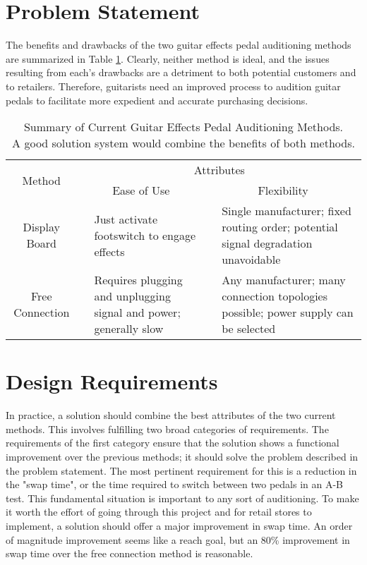 \section{Problem Statement}

The benefits and drawbacks of the two guitar effects pedal auditioning methods are summarized in Table \ref{tab:prev_method_pro_con}.  Clearly, neither method is ideal, and the issues resulting from each's drawbacks are a detriment to both potential customers and to retailers.  Therefore, guitarists need an improved process to audition guitar pedals to facilitate more expedient and accurate purchasing decisions.

	\begin{table}
	\begin{center}
	\renewcommand{\arraystretch}{2}
	\captionsetup{justification=centering}
	\caption{Summary of Current Guitar Effects Pedal Auditioning Methods.  \\A good solution system would combine the benefits of both methods.}
	\raggedbottom
	\begin{tabular}{|c|c p{2in}|c p{2in}|}
		\hline
		\multirow{2}{*}{Method} & \multicolumn{4}{c|}{Attributes} \\
		 & \multicolumn{2}{c}{Ease of Use} & \multicolumn{2}{c|}{Flexibility} \\
		\hline
		Display Board & 
		\cmark & 
		Just activate footswitch to engage effects &
		\xmark &
		Single manufacturer; fixed routing order; potential signal degradation unavoidable\\

		\hline

		Free Connection &
		\xmark & 
		Requires plugging and unplugging signal and power; generally slow
		&
		\cmark & 
		Any manufacturer; many connection topologies possible; power supply can be selected\\
		\hline
	\end{tabular}
	\label{tab:prev_method_pro_con}
	\end{center}
	\end{table}

\section{Design Requirements}

In practice, a solution should combine the best attributes of the two current methods.  This involves fulfilling two broad categories of requirements.  The requirements of the first category ensure that the solution shows a functional improvement over the previous methods; it should solve the problem described in the problem statement.  The most pertinent requirement for this is a reduction in the "swap time", or the time required to switch between two pedals in an A-B test.  This fundamental situation is important to any sort of auditioning.  To make it worth the effort of going through this project and for retail stores to implement, a solution should offer a major improvement in swap time.  An order of magnitude improvement seems like a reach goal, but an 80\% improvement in swap time over the free connection method is reasonable.

